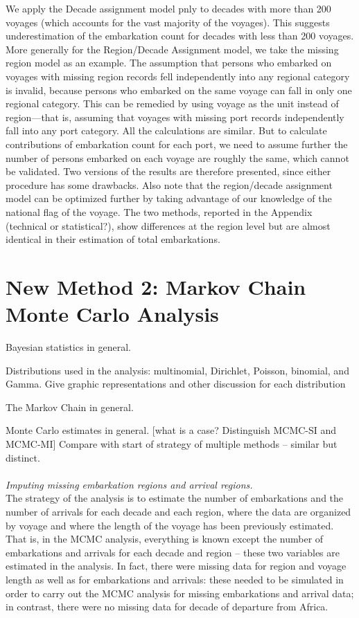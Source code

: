 \documentclass[preprint,12pt]{elsarticle}
\begin{document}
We apply the Decade assignment model pnly to decades with more than 200 voyages (which accounts for the vast majority of the voyages). This suggests underestimation of the embarkation count for decades with less than 200 voyages. More generally for the Region/Decade Assignment model, we take the missing region model as an example. The assumption that persons who embarked on voyages with missing region records fell independently into any regional category is invalid, because persons who embarked on the same voyage can fall in only one regional category. This can be remedied by using voyage as the unit instead of region—that is, assuming that voyages with missing port records independently fall into any port category. All the calculations are similar. But to calculate contributions of embarkation count for each port, we need to assume further the number of persons embarked on each voyage are roughly the same, which cannot be validated. Two versions of the results are therefore presented, since either procedure has some drawbacks. Also note that the region/decade assignment model can be optimized further by taking advantage of our knowledge of the national flag of the voyage. The two methods, reported in the Appendix (technical or statistical?), show differences at the region level but are almost identical in their estimation of total embarkations.\\


\section{New Method 2: Markov Chain Monte Carlo Analysis}

Bayesian statistics in general.

Distributions used in the analysis:
multinomial, Dirichlet, Poisson, binomial, and Gamma. Give graphic representations and other discussion for each distribution

The Markov Chain in general.

Monte Carlo estimates in general.
[what is a case? Distinguish MCMC-SI and MCMC-MI] Compare with start of strategy of multiple methods – similar but distinct.\\
\\
\noindent
\textit{Imputing missing embarkation regions and arrival regions.}\\
\indent
The strategy of the analysis is to estimate the number of embarkations and the number of arrivals for each decade and each region, where the data are organized by voyage and where the length of the voyage has been previously estimated. That is, in the MCMC analysis, everything is known except the number of embarkations and arrivals for each decade and region – these two variables are estimated in the analysis. In fact, there were missing data for region and voyage length as well as for embarkations and arrivals: these needed to be simulated in order to carry out the MCMC analysis for missing embarkations and arrival data; in contrast, there were no missing data for decade of departure from Africa.\\
\end{document}
